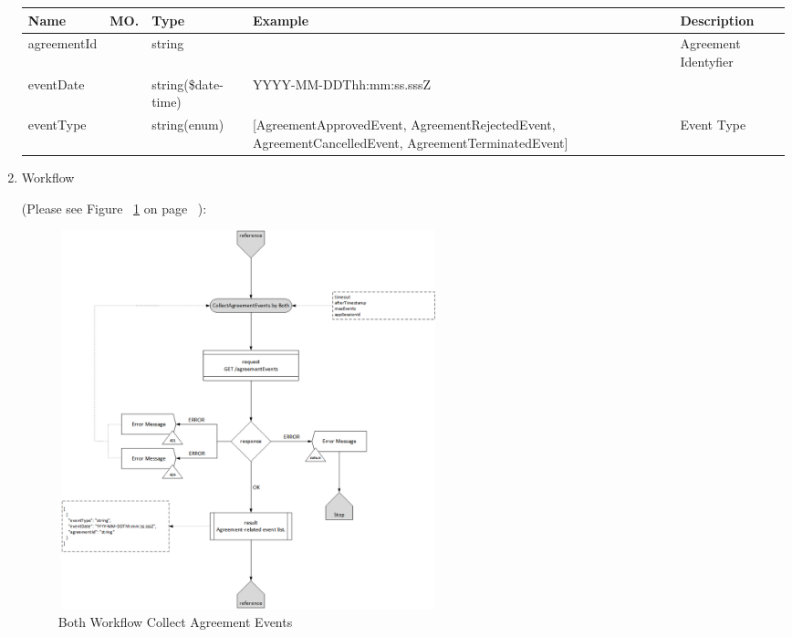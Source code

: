 \begin{enumerate}
\begin{center}
\begin{tabular}{|p{3cm}|l|p{3cm}|p{3cm}|p{4cm}|} 
\hline
\rowcolor{lightgray}	Name	& MO.	& Type	& Example & 	Description \\
\hline

agreementId		& 	& 	string				&						&	Agreement Identyfier \\ 
\hline

eventDate		& 	& 	string(\$date-time)	&	YYYY-MM-DDThh:mm:ss.sssZ	&	 \\ 
\hline

eventType		& 	& 	string(enum)		&	[AgreementApprovedEvent, AgreementRejectedEvent, AgreementCancelledEvent, AgreementTerminatedEvent] &	Event Type \\ 
\hline

\end{tabular}
\end{center}


\item Workflow

(Please see Figure ~\ref{fig:CAE} on page ~\pageref{fig:CAE}):

\begin{figure}[htbp]
    \centering
    \includegraphics[width=11cm,height=11cm,angle=0]{./diag/Workflow/Market/CollectAgreementEvents-B-Workflow.png}
    \caption{Both Workflow Collect Agreement Events }
	\label{fig:CAE}
\end{figure}

\end{enumerate}

